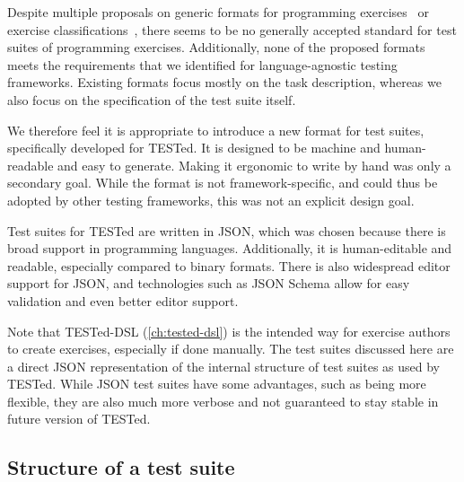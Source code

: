 \documentclass[../main]{subfiles}
\begin{document}
Despite multiple proposals on generic formats for programming exercises~\autocite{edwardsDevelopingCommonFormat2008a,paivaAnotherProgrammingExercises2020,queirosPexilProgrammingExercises2011,verhoeffProgrammingTaskPackages2008} or exercise classifications~\autocite{leOperationalizingContinuumWelldefined2013,simoesNatureProgrammingExercises2020}, there seems to be no generally accepted standard for test suites of programming exercises.
Additionally, none of the proposed formats meets the requirements that we identified for language-agnostic testing frameworks.
Existing formats focus mostly on the task description, whereas we also focus on the specification of the test suite itself.

We therefore feel it is appropriate to introduce a new format for test suites, specifically developed for TESTed.
It is designed to be machine and human-readable and easy to generate.
Making it ergonomic to write by hand was only a secondary goal.
While the format is not framework-specific, and could thus be adopted by other testing frameworks, this was not an explicit design goal.

Test suites for TESTed are written in JSON, which was chosen because there is broad support in programming languages.
Additionally, it is human-editable and readable, especially compared to binary formats.
There is also widespread editor support for JSON, and technologies such as JSON Schema allow for easy validation and even better editor support.

Note that TESTed-DSL (\cref{ch:tested-dsl}) is the intended way for exercise authors to create exercises, especially if done manually.
The test suites discussed here are a direct JSON representation of the internal structure of test suites as used by TESTed.
While JSON test suites have some advantages, such as being more flexible, they are also much more verbose and not guaranteed to stay stable in future version of TESTed.

\subsection{Structure of a test suite}\label{subsec:structure-of-a-test-suite}
\end{document}
